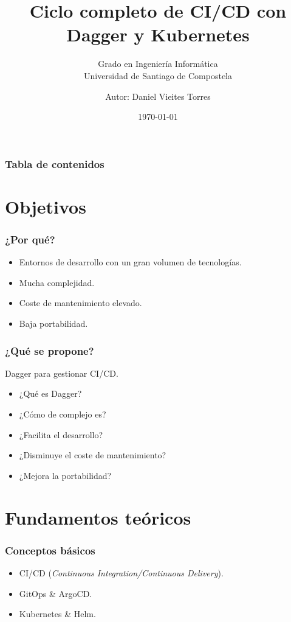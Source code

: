 \documentclass{beamer}
\begin{document}
\title{Ciclo completo de CI/CD con Dagger y Kubernetes}
\subtitle{Grado en Ingeniería Informática \\
    Universidad de Santiago de Compostela}
\author{Autor: Daniel Vieites Torres}
\date{\today}

\begin{frame}
    \titlepage
\end{frame}

\begin{frame}
    \frametitle{Tabla de contenidos}\tableofcontents
\end{frame}

\section{Objetivos}
\begin{frame}
    \frametitle{¿Por qué?}
    \begin{itemize}
        \item Entornos de desarrollo con un gran volumen de tecnologías. \pause
        \item Mucha complejidad. \pause
        \item Coste de mantenimiento elevado. \pause
        \item Baja portabilidad.
    \end{itemize}
\end{frame}

\begin{frame}
    \frametitle{¿Qué se propone?}
    Dagger para gestionar CI/CD.
    \begin{itemize}
        \item ¿Qué es Dagger? \pause
        \item ¿Cómo de complejo es? \pause
        \item ¿Facilita el desarrollo? \pause
        \item ¿Disminuye el coste de mantenimiento? \pause
        \item ¿Mejora la portabilidad?
    \end{itemize}
\end{frame}

\section{Fundamentos teóricos}
\begin{frame}
    \frametitle{Conceptos básicos}
    \begin{itemize}
        \item CI/CD (\textit{Continuous Integration/Continuous Delivery}). \pause
        \item GitOps \& ArgoCD. \pause
        \item Kubernetes \& Helm. \pause
    \end{itemize}
\end{frame}
\end{document}

